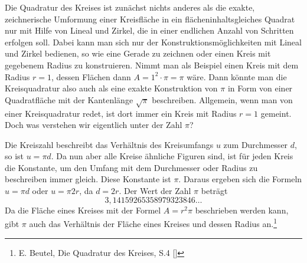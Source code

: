 Die Quadratur des Kreises ist zunächst nichts anderes als die exakte, zeichnerische Umformung einer Kreisfläche in ein flächeninhaltsgleiches Quadrat nur mit Hilfe von Lineal und Zirkel, die in einer endlichen Anzahl von Schritten erfolgen soll. Dabei kann man sich nur der Konstruktionsmöglichkeiten mit Lineal und Zirkel bedienen, so wie eine Gerade zu zeichnen oder einen Kreis mit gegebenem Radius zu konstruieren. Nimmt man als Beispiel einen Kreis mit dem Radius \(r=1\), dessen Flächen dann \(A=1^2\cdot\pi=\pi\)  wäre. Dann könnte man die Kreisquadratur also auch als eine exakte Konstruktion von \(\pi\) in Form von einer Quadratfläche mit der Kantenlänge \(\sqrt{\pi}\) beschreiben. Allgemein, wenn man von einer Kreisquadratur redet, ist dort immer ein Kreis mit Radius \(r = 1\) gemeint. Doch was verstehen wir eigentlich unter der Zahl \(\pi\)?\par
Die Kreiszahl beschreibt das Verhältnis des Kreisumfangs \(u\) zum Durchmesser \(d\), so ist \(u=\pi d\). Da nun aber alle Kreise ähnliche Figuren sind, ist für jeden Kreis die Konstante, um den Umfang mit dem Durchmesser oder Radius zu beschreiben immer gleich. Diese Konstante ist \(\pi\). Daraus ergeben sich die Formeln \(u=\pi d\) oder \(u=\pi 2r\), da    \(d=2r\). Der Wert der Zahl $\pi$ beträgt \[3,14159265358979323846\dots\] Da die Fläche eines Kreises mit der Formel $A=r^2\pi$ beschrieben werden kann, gibt $\pi$ auch das Verhältnis der Fläche eines Kreises und dessen Radius an.\footnote{E. Beutel, Die Quadratur des Kreises, S.4 [\EugenBeutelInt]}

